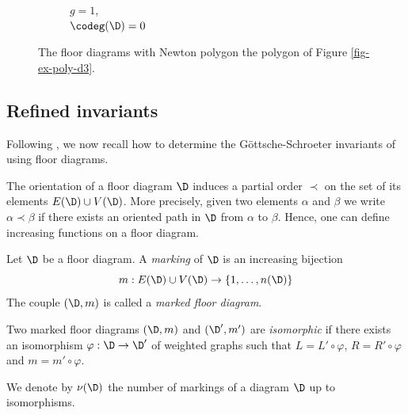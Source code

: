 \begin{exam}
\begin{figure}[ht]
\begin{subfigure}[t]{0.24\textwidth}
	\caption{$g=1$, \\ $\codeg(\D) = 0$}
    \label{fig-ex-diag-d3-d}
\end{subfigure}
	\caption{The floor diagrams with Newton polygon the polygon of Figure \ref{fig-ex-poly-d3}.}
	\label{fig-ex-diag-d3}
\end{figure}
\end{exam}




\subsection{Refined invariants} \label{subsec-refined-invariants}

Following \cite{brugalle_polynomiality_2022}, we now recall how to determine the Göttsche-Schroeter invariants of \cite{gottsche_refined_2019} using floor diagrams.


The orientation of a floor diagram $\D$ induces a partial order $\prec$ on the set of its elements $E(\D) \cup V(\D)$. More precisely, given two elements $\alpha$ and $\beta$ we write $\alpha \prec \beta$ if there exists an oriented path in $\D$ from $\alpha$ to $\beta$.  Hence, one can define increasing functions on a floor diagram.

\begin{defi}[Marking]
Let $\D$ be a floor diagram. A \emph{marking} of $\D$ is an increasing bijection 
\[ m : E(\D) \cup V(\D) \to \{1,\dots,n(\D) \} \]
The couple $(\D,m)$ is called a \emph{marked floor diagram}.
 
 Two marked floor diagrams $(\D,m)$ and $(\D',m')$ are \emph{isomorphic} if there exists an isomorphism $\varphi : \D \to \D'$ of weighted graphs such that $L = L' \circ \varphi$, $R = R'\circ \varphi$ and $m=m' \circ \varphi$.
 
 We denote by $\nu(\D)$ the number of markings of a diagram $\D$ up to isomorphisms.
\end{defi}



